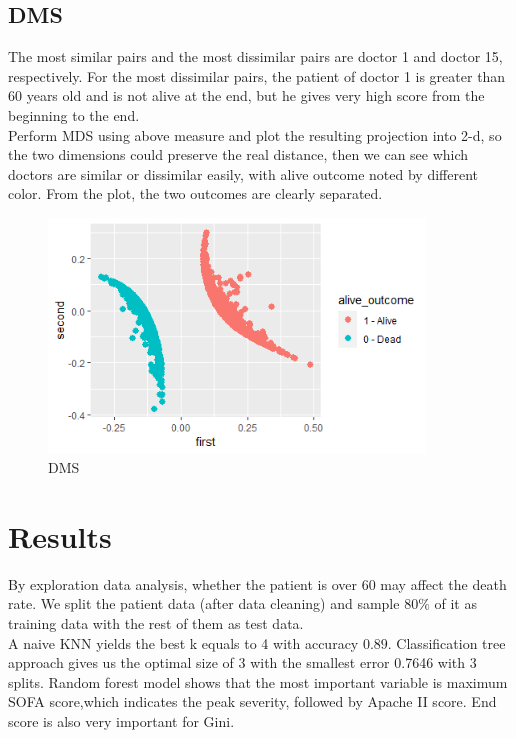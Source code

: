 \documentclass{article}
\begin{document}
\subsection{DMS}

The most similar pairs and the most dissimilar pairs are doctor 1 and doctor 15, respectively. For the most dissimilar pairs, the patient of doctor 1 is greater than 60 years old and is not alive at the end, but he gives very high score from the beginning to the end. \\

Perform MDS using above measure and plot the resulting projection into 2-d, so the two dimensions could preserve the real distance, then we can see which doctors are similar or dissimilar easily, with alive outcome noted by different color. From the plot, the two outcomes are clearly separated.\\

\begin{figure}[h!]
  \centering
  \includegraphics[width=100mm]{dms.png}
  \caption{DMS}
  \label{fig:DMS output}
\end{figure}

\section{Results}

By exploration data analysis, whether the patient is over 60 may affect the death rate. We split the patient data (after data cleaning) and sample $80\%$ of it as training data with the rest of them as test data. \\

A naive KNN yields the best k equals to 4 with accuracy $0.89$. Classification tree approach gives us the optimal size of $3$ with the smallest error 0.7646 with 3 splits. Random forest model shows that the most important variable is maximum SOFA score,which indicates the peak severity, followed by Apache II score. End score is also very important for Gini. \\
\end{document}
